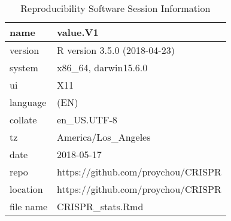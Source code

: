 \documentclass[]{article}
\begin{document}
\begin{table}[!h]

\caption{\label{tab:reproducibility}Reproducibility Software Session Information}
\centering
\fontsize{7}{9}\selectfont
\begin{tabular}[t]{ll}
\toprule
name & value.V1\\
\midrule
version & R version 3.5.0 (2018-04-23)\\
system & x86\_64, darwin15.6.0\\
ui & X11\\
language & (EN)\\
collate & en\_US.UTF-8\\
tz & America/Los\_Angeles\\
date & 2018-05-17\\
repo & https://github.com/proychou/CRISPR\\
location & https://github.com/proychou/CRISPR\\
file name & CRISPR\_stats.Rmd\\
\bottomrule
\end{tabular}
\end{table}
\end{document}
